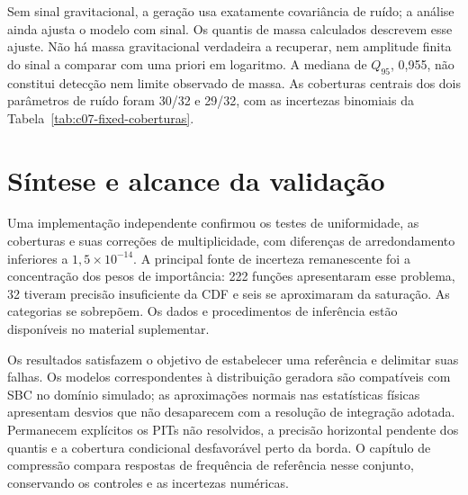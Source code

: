 Sem sinal gravitacional, a geração usa exatamente covariância de
ruído; a análise ainda ajusta o modelo com sinal. Os quantis de massa
calculados descrevem esse ajuste. Não há massa gravitacional
verdadeira a recuperar, nem amplitude finita do sinal a comparar
com uma priori em logaritmo. A mediana de \(Q_{95}\), 0,955, não
constitui detecção nem limite observado de massa. As coberturas
centrais dos dois parâmetros de ruído foram 30/32 e 29/32, com as
incertezas binomiais da Tabela~\ref{tab:c07-fixed-coberturas}.

\section{Síntese e alcance da validação}

Uma implementação independente confirmou os testes de uniformidade,
as coberturas e suas correções de multiplicidade, com diferenças de
arredondamento inferiores a $1{,}5\times10^{-14}$. A principal fonte
de incerteza remanescente foi a concentração dos pesos de importância:
222 funções apresentaram esse problema, 32 tiveram precisão
insuficiente da CDF e seis se aproximaram da saturação. As categorias
se sobrepõem. Os dados e procedimentos de inferência estão disponíveis
no material suplementar.

Os resultados satisfazem o objetivo de estabelecer uma
referência e delimitar suas falhas. Os modelos correspondentes à
distribuição geradora são compatíveis com SBC no domínio simulado;
as aproximações normais nas estatísticas físicas apresentam desvios
que não desaparecem com a resolução de integração adotada.
Permanecem explícitos os PITs não resolvidos, a precisão horizontal
pendente dos quantis e a cobertura condicional desfavorável perto
da borda. O capítulo de compressão compara respostas de frequência de
referência nesse conjunto, conservando os controles e as
incertezas numéricas.
